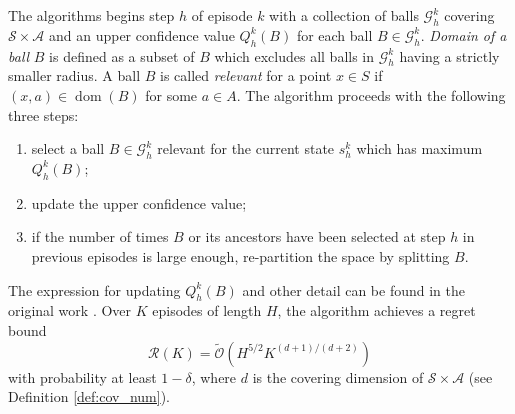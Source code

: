 \documentclass{article}
\numberwithin{equation}{section}
\newcommand{\cA}{\mathcal{A}}
\newcommand{\cS}{\mathcal{S}}
\begin{document}
The algorithms begins step \(h\) of episode \(k\) with a collection of balls \( \mathcal{G}^k_h \) covering  \(\cS \times \cA \) and an upper confidence value \( Q^k_h(B) \) for each ball \(B \in \mathcal{G}^k_h \). \textit{Domain of a ball} \(B\) is defined as a subset of $B$ which excludes all balls in \( \mathcal{G}^k_h \) having a strictly smaller radius. A ball $B$ is called \textit{relevant} for a point $x \in S$ if $(x,a) \in \operatorname{dom}(B)$ for some $a \in A$. The algorithm proceeds with the following three steps:
\begin{enumerate}
    \item select a ball \(B \in \mathcal{G}^k_h \) relevant for the current state \( s^k_h \) which has maximum \( Q^k_h(B) \);
    \item update the upper confidence value;
    \item if the number of times $B$ or its ancestors have been selected at step $h$ in previous episodes is large enough, re-partition the space by splitting $B$.
\end{enumerate}
The expression for updating \( Q^k_h(B) \) and other detail can be found in the original work \citep{sinclair2019adaptive}. Over $K$ episodes of length $H$, the algorithm achieves a regret bound
$$
\mathcal{R}(K)=\widetilde{\mathcal{O}}\left(H^{5 / 2} K^{(d+1) /(d+2)}\right)
$$
with probability at least $1-\delta$, where $d$ is the covering dimension of $\cS \times\cA$ (see Definition \ref{def:cov_num}).
\end{document}
